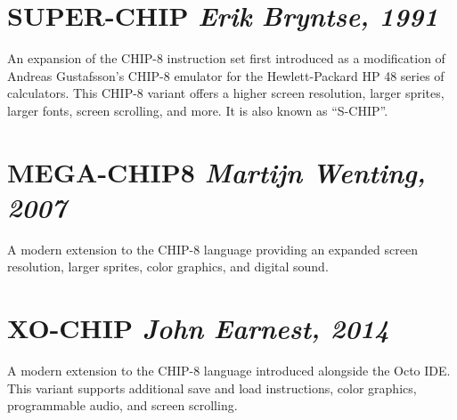 \documentclass{article}
\newcommand{\subtitle}[1] {{\hfill \small{\emph{#1}}}}
\begin{document}
\begin{multicols}{2}
\section*{SUPER-CHIP \subtitle{Erik Bryntse, 1991}}
An expansion of the CHIP-8 instruction set first introduced as a modification of Andreas Gustafsson's CHIP-8 emulator for the Hewlett-Packard HP 48 series of calculators. This CHIP-8 variant offers a higher screen resolution, larger sprites, larger fonts, screen scrolling, and more. It is also known as ``S-CHIP''. \cite{schip}

\section*{MEGA-CHIP8 \subtitle{Martijn Wenting, 2007}}
A modern extension to the CHIP-8 language providing an expanded screen resolution, larger sprites, color graphics, and digital sound. \cite{megachip2, megachip1}

\section*{XO-CHIP \subtitle{John Earnest, 2014}}
A modern extension to the CHIP-8 language introduced alongside the Octo IDE. This variant supports additional save and load instructions, color graphics, programmable audio, and screen scrolling. \cite{xochip}

\printbibliography

\end{multicols}

\end{document}
